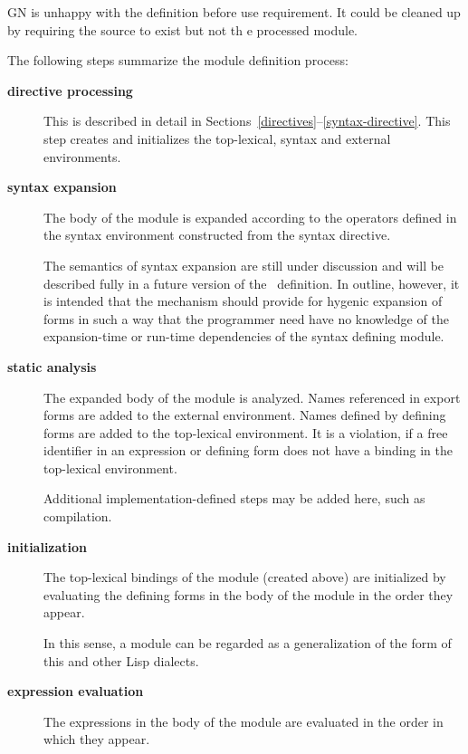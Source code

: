 %
\begin{optPrivate}
    GN is unhappy with the definition before use requirement.  It could be
    cleaned up by requiring the source to exist but not th e processed module.
\end{optPrivate}
%
\begin{optDefinition}
The following steps summarize the module definition process:
%
\begin{description}
    \item[{\bf directive processing}] This is described in detail in
    Sections~\ref{directives}--\ref{syntax-directive}.  This step creates and
    initializes the top-lexical, syntax and external environments.

    \item[{\bf syntax expansion}] 
     
     The body of the module is expanded
    according to the operators defined in the syntax environment constructed
    from the syntax directive.
    \begin{note}
        The semantics of syntax expansion are still under discussion and will be
        described fully in a future version of the \eulisp\ definition.  In
        outline, however, it is intended that the mechanism should provide for
        hygenic expansion of forms in such a way that the programmer need have
        no knowledge of the expansion-time or run-time dependencies of the
        syntax defining module.
    \end{note}

    \item[{\bf static analysis}] The expanded body of the module is analyzed.
    Names referenced in export forms are added to the external environment.
    Names defined by defining forms are added to the top-lexical environment. It
    is a violation, if a free identifier in an expression or defining form
    does not have a binding in the top-lexical environment.
    \begin{note}
        Additional implementation-defined steps may be added here, such as
        compilation.
    \end{note}

    \item[{\bf initialization}] The top-lexical bindings of the module (created
    above) are initialized by evaluating the defining forms in the body of the
    module in the order they appear.
    \begin{note}
        In this sense, a module can be regarded as a generalization of the
         form of this and other Lisp dialects.
    \end{note}

    \item[{\bf expression evaluation}] The expressions in the body of the module
    are evaluated in the order in which they appear.
\end{description}
%
\end{optDefinition}
